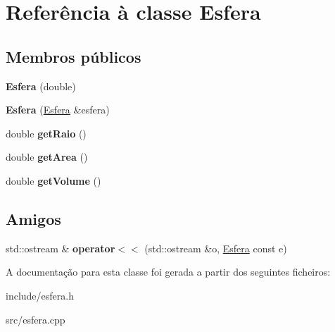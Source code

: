 \hypertarget{classEsfera}{\section{Referência à classe Esfera}
\label{classEsfera}
}
\subsection*{Membros públicos}
\begin{DoxyCompactItemize}
\item 
\hypertarget{classEsfera_a330823d7c71b1284a1620e6e72e1e16d}{{\bfseries Esfera} (double)}\label{classEsfera_a330823d7c71b1284a1620e6e72e1e16d}

\item 
\hypertarget{classEsfera_a28aea864284d8be07048459cad1f39cd}{{\bfseries Esfera} (\hyperlink{classEsfera}{Esfera} \&esfera)}\label{classEsfera_a28aea864284d8be07048459cad1f39cd}

\item 
\hypertarget{classEsfera_aa711a87a4743858e1c0d396868d70f01}{double {\bfseries get\-Raio} ()}\label{classEsfera_aa711a87a4743858e1c0d396868d70f01}

\item 
\hypertarget{classEsfera_a2cc481381e1e468b48621b7a17808455}{double {\bfseries get\-Area} ()}\label{classEsfera_a2cc481381e1e468b48621b7a17808455}

\item 
\hypertarget{classEsfera_a605dba4b2608a0c07c6dd96b283aec74}{double {\bfseries get\-Volume} ()}\label{classEsfera_a605dba4b2608a0c07c6dd96b283aec74}

\end{DoxyCompactItemize}
\subsection*{Amigos}
\begin{DoxyCompactItemize}
\item 
\hypertarget{classEsfera_a9486c3156f0a67d3d0a85a4f7118723f}{std\-::ostream \& {\bfseries operator$<$$<$} (std\-::ostream \&o, \hyperlink{classEsfera}{Esfera} const e)}\label{classEsfera_a9486c3156f0a67d3d0a85a4f7118723f}

\end{DoxyCompactItemize}


A documentação para esta classe foi gerada a partir dos seguintes ficheiros\-:\begin{DoxyCompactItemize}
\item 
include/esfera.\-h\item 
src/esfera.\-cpp\end{DoxyCompactItemize}
